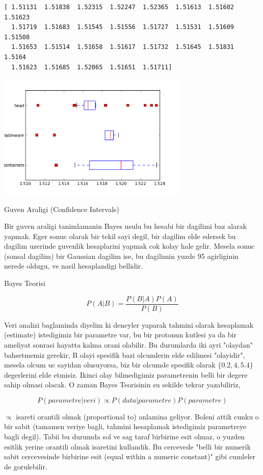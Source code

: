 \documentclass[12pt,fleqn]{article}\usepackage{../common}
\begin{document}
\begin{verbatim}
[ 1.51131  1.51838  1.52315  1.52247  1.52365  1.51613  1.51602  1.51623
  1.51719  1.51683  1.51545  1.51556  1.51727  1.51531  1.51609  1.51508
  1.51653  1.51514  1.51658  1.51617  1.51732  1.51645  1.51831  1.5164
  1.51623  1.51685  1.52065  1.51651  1.51711]
\end{verbatim}

\includegraphics[height=6cm]{05_04.png}

Guven Araligi (Confidence Intervals)

Bir guven araligi tanimlamanin Bayes usulu bu hesabi bir dagilimi baz
alarak yapmak. Eger sonuc olarak bir tekil sayi degil, bir dagilim elde
edersek bu dagilim uzerinde guvenlik hesaplarini yapmak cok kolay hale
gelir. Mesela sonuc (sonsal dagilim) bir Gaussian dagilim ise, bu dagilimin
yuzde 95 agirliginin nerede oldugu, ve nasil hesaplandigi bellidir.

Bayes Teorisi

$$ P(A|B)  = \frac{ P(B|A)P(A)}{P(B)} $$

Veri analizi baglaminda diyelim ki deneyler yaparak tahmini olarak
hesaplamak (estimate) istedigimiz bir parametre var, bu bir protonun
kutlesi ya da bir ameliyat sonrasi hayatta kalma orani olabilir. Bu
durumlarda iki ayri "olaydan" bahsetmemiz gerekir, B olayi spesifik bazi
olcumlerin elde edilmesi "olayidir", mesela olcum uc sayidan olusuyorsa,
biz bir olcumde spesifik olarak $\{0.2,4,5.4\}$ degerlerini elde
etmisiz. Ikinci olay bilmedigimiz parametrenin belli bir degere sahip
olmasi olacak. O zaman Bayes Teorisinin su sekilde tekrar yazabiliriz, 

$$ P(parametre | veri ) \propto P(data | parametre)P(parametre) $$

$\propto$ isareti orantili olmak (proportional to) anlamina geliyor. Boleni
attik cunku o bir sabit (tamamen veriye bagli, tahmini hesaplamak
istedigimiz parametreye bagli degil). Tabii bu durumda sol ve sag taraf
birbirine esit olmaz, o yuzden esitlik yerine orantili olmak isaretini
kullandik. Bu cercevede "belli bir numerik sabit cercevesinde birbirine
esit (equal within a numeric constant)" gibi cumleler de gorulebilir. 
\end{document}
